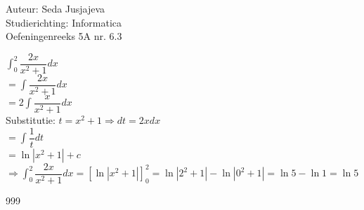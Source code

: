 \documentclass[a4paper]{article}
\newcommand{\integral}{\displaystyle\int}
\begin{document}
\noindent \large Auteur: Seda Jusjajeva\\
\noindent \large Studierichting: Informatica\\
\noindent \large Oefeningenreeks 5A nr. 6.3\\

\medskip

\normalsize


$\integral_0^2 \dfrac{2x}{x^2 + 1}dx$ \\

$= \integral \dfrac{2x}{x^2 + 1}dx$ \\

$= 2\integral \dfrac{x}{x^2 + 1}dx$ \\

Substitutie: $t = x^2 + 1 \Rightarrow dt = 2xdx$ \\

$= \integral \dfrac{1}{t}dt$ \\

$= \ln\left|x^2 + 1\right| + c$ \\

$\Rightarrow \integral_0^2 \dfrac{2x}{x^2 + 1}dx = \left[\ln\left|x^2 + 1\right|\right]_0^2 = \ln \left|2^2 + 1\right| - \ln \left|0^2 + 1\right| = \ln 5 - \ln 1 = \ln 5$ \\




\begin{thebibliography}{999}
\end{thebibliography}
\end{document}
